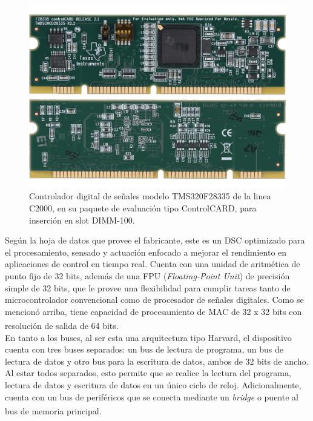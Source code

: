 \begin{figure}[h]
    \centering
    \includegraphics[scale=0.2]{Imagenes/ControlCARD.png}
    \caption{Controlador digital de señales modelo TMS320F28335 de la linea C2000, en su paquete de evaluación tipo ControlCARD, para inserción en slot DIMM-100.}
    \label{ControlCARD}
\end{figure}

Según la hoja de datos que provee el fabricante, este es un DSC optimizado para el procesamiento, sensado y actuación enfocado a mejorar el rendimiento en aplicaciones de control en tiempo real. Cuenta con una unidad de aritmética de punto fijo de 32 bits, además de una FPU (\textit{Floating-Point Unit}) de precisión simple de 32 bits, que le provee una flexibilidad para cumplir tareas tanto de microcontrolador convencional como de procesador de señales digitales. Como se mencionó arriba, tiene capacidad de procesamiento de MAC de 32 x 32 bits con resolución de salida de 64 bits.\textsuperscript{\cite{DSP-Datasheet}}\textsuperscript{\cite{DSP-TechManual}}\\

En tanto a los buses, al ser esta una arquitectura tipo Harvard, el dispositivo cuenta con tres buses separados: un bus de lectura de programa, un bus de lectura de datos y otro bus para la escritura de datos, ambos de 32 bits de ancho. Al estar todos separados, esto permite que se realice la lectura del programa, lectura de datos y escritura de datos en un único ciclo de reloj. Adicionalmente, cuenta con un bus de periféricos que se conecta mediante un \textit{bridge} o puente al bus de memoria principal.\textsuperscript{\cite{DSP-Datasheet}}\textsuperscript{\cite{DSP-TechManual}}\\

